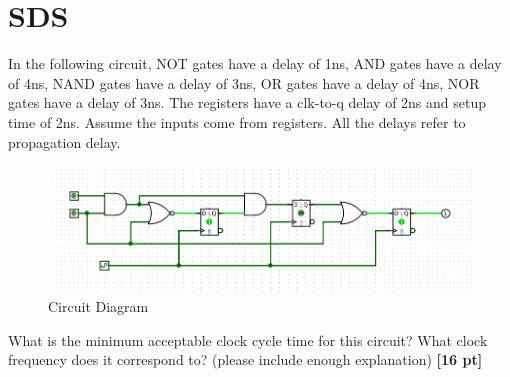 \documentclass[a4paper]{article}
\begin{document}
\newpage
\section{SDS}
 In the following circuit, NOT gates have a delay of 1ns, AND gates have a delay of 4ns, NAND gates have a delay of 3ns, OR gates have a delay of 4ns, NOR gates have a delay of 3ns. The registers have a clk-to-q delay of 2ns and setup time of 2ns. Assume the inputs
 come from registers. All the delays refer to propagation delay.\\
 
\begin{figure}[hp]
    \centering
    \includegraphics[width=1.0\textwidth]{Q2.png}
    \caption{Circuit Diagram}
    \label{fig:q2}
\end{figure}

What is the minimum acceptable clock cycle time for this circuit? What
 clock frequency does it correspond to? (please include enough explanation) \textbf{[16 pt]}
 
\end{document}
